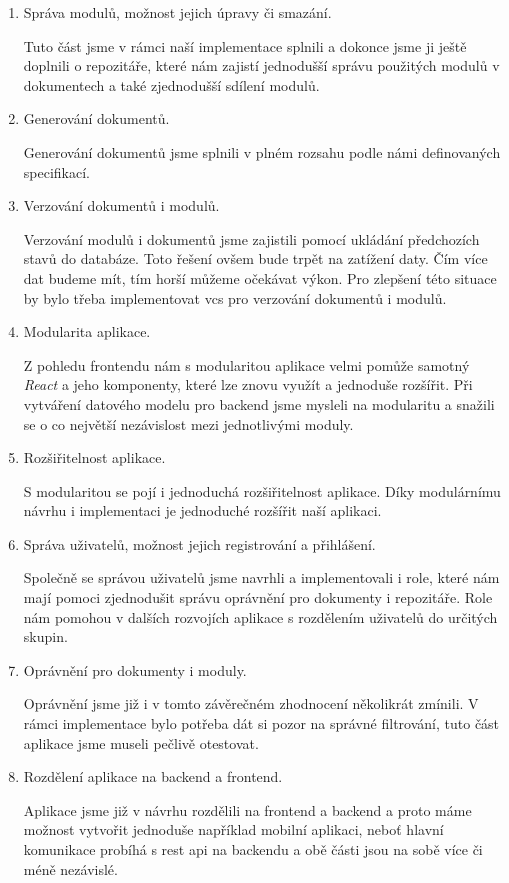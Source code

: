 \begin{enumerate}
    \item Správa modulů, možnost jejich úpravy či smazání.

          Tuto část jsme v rámci naší implementace splnili a dokonce jsme ji ještě doplnili o repozitáře,
          které nám zajistí jednodušší správu použitých modulů v dokumentech a také zjednodušší sdílení
          modulů.
    \item Generování dokumentů.

          Generování dokumentů jsme splnili v plném rozsahu podle námi definovaných specifikací.
    \item Verzování dokumentů i modulů.

          Verzování modulů i dokumentů jsme zajistili pomocí ukládání předcho\-zích stavů do databáze. Toto řešení
          ovšem bude trpět na zatížení daty. Čím více dat budeme mít, tím horší můžeme očekávat výkon. Pro zlepšení
          této situace by bylo třeba implementovat \gls{vcs} pro verzování dokumentů i modulů.
    \item Modularita aplikace.

         Z pohledu frontendu nám s modularitou aplikace velmi pomůže samotný \textit{React} a jeho komponenty, které lze znovu využít
         a jednoduše rozšířit. Při vytváření datového modelu pro backend jsme mysleli na modularitu a snažili se o co
         největší nezávislost mezi jednotlivými moduly.
    \item Rozšiřitelnost aplikace.

          S modularitou se pojí i jednoduchá rozšiřitelnost aplikace. Díky modulárnímu návrhu i implementaci je jednoduché
          rozšířit naší aplikaci.
    \item Správa uživatelů, možnost jejich registrování a přihlášení.

          Společně se správou uživatelů jsme navrhli a implementovali i role, které nám mají pomoci zjednodušit správu oprávnění
          pro dokumenty i repozitáře. Role nám pomohou v dalších rozvojích aplikace s rozdělením uživatelů do určitých skupin.
    \item Oprávnění pro dokumenty i moduly.

          Oprávnění jsme již i v tomto závěrečném zhodnocení několikrát zmínili. V rámci implementace bylo potřeba dát si pozor
          na správné filtrování, tuto část aplikace jsme museli pečlivě otestovat.
    \item Rozdělení aplikace na backend a frontend.

          Aplikace jsme již v návrhu rozdělili na frontend a backend a proto máme možnost vytvořit jednoduše například mobilní
          aplikaci, neboť hlavní komunikace probíhá s \gls{rest} \gls{api} na backendu a obě části jsou na sobě více či méně nezávislé.
\end{enumerate}